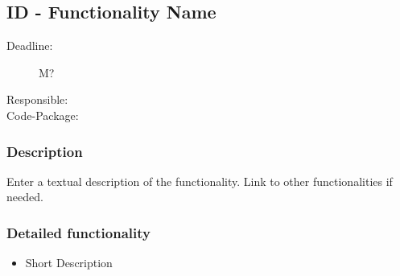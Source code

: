 \subsection{ID - Functionality Name}
\label{Functionality:ID}

\begin{description}
\item[Deadline:] M?
\item[Responsible:]
\item[Code-Package:]
\end{description}

\subsubsection*{Description}

Enter a textual description of the functionality. Link to other functionalities if needed. 


\subsubsection*{Detailed functionality}

\begin{itemize}
\item Short Description
\end{itemize}


